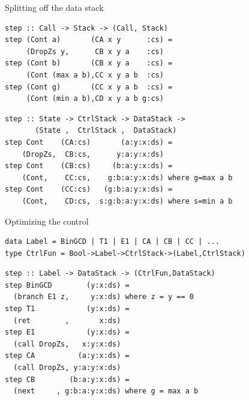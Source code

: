 \documentclass[pdf]{beamer}
\begin{document}
\begin{frame}[fragile]{Splitting off the data stack}
\begin{block}{}
\begin{verbatim}
step :: Call -> Stack -> (Call, Stack)
step (Cont a)       (CA x y      :cs) =
     (DropZs y,      CB x y a    :cs)
step (Cont b)       (CB x y a    :cs) =
     (Cont (max a b),CC x y a b  :cs)
step (Cont g)       (CC x y a b  :cs) =
     (Cont (min a b),CD x y a b g:cs)
\end{verbatim}
\end{block}
\begin{block}{}
\begin{verbatim}
step :: State -> CtrlStack -> DataStack ->
       (State ,  CtrlStack ,  DataStack)
step Cont    (CA:cs)       (a:y:x:ds) = 
    (DropZs,  CB:cs,      y:a:y:x:ds)
step Cont    (CB:cs)     (b:a:y:x:ds) = 
    (Cont,    CC:cs,    g:b:a:y:x:ds) where g=max a b
step Cont    (CC:cs)   (g:b:a:y:x:ds) = 
    (Cont,    CD:cs,  s:g:b:a:y:x:ds) where s=min a b
\end{verbatim}
\end{block}
\end{frame}

\begin{frame}[fragile]{Optimizing the control}
\begin{block}{}
\begin{small}
\begin{verbatim}
data Label = BinGCD | T1 | E1 | CA | CB | CC | ...
type CtrlFun = Bool->Label->CtrlStack->(Label,CtrlStack)
\end{verbatim}
\end{small}
\end{block}

\begin{block}{}
\begin{verbatim}
step :: Label -> DataStack -> (CtrlFun,DataStack)
step BinGCD        (y:x:ds) =
  (branch E1 z,     y:x:ds) where z = y == 0
step T1            (y:x:ds) = 
  (ret        ,       x:ds)
step E1            (y:x:ds) = 
  (call DropZs,   x:y:x:ds)
step CA          (a:y:x:ds) = 
  (call DropZs, y:a:y:x:ds)
step CB        (b:a:y:x:ds) = 
  (next     , g:b:a:y:x:ds) where g = max a b
\end{verbatim}
\end{block}

\end{frame}
\end{document}
